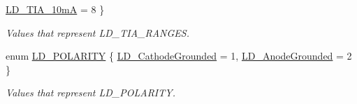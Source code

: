\begin{DoxyCompactItemize}
\hyperlink{group___t_cube_laser_diode_ggafa4a381f77aedb5578f7b24d6d170231abecf5bca7ffdbbc85793bb8972694f1b}{L\+D\+\_\+\+T\+I\+A\+\_\+10mA} = 8
 \}\begin{DoxyCompactList}\small\item\em Values that represent L\+D\+\_\+\+T\+I\+A\+\_\+\+R\+A\+N\+G\+ES. \end{DoxyCompactList}
\item 
enum \hyperlink{group___t_cube_laser_diode_ga96e125d762599dedaf1ad44586995da3}{L\+D\+\_\+\+P\+O\+L\+A\+R\+I\+TY} \{ \hyperlink{group___t_cube_laser_diode_gga96e125d762599dedaf1ad44586995da3a70a15247bc276a3c0cf4136f16e10da7}{L\+D\+\_\+\+Cathode\+Grounded} = 1, 
\hyperlink{group___t_cube_laser_diode_gga96e125d762599dedaf1ad44586995da3a7cf5d179e8b08ff3700a682aab4b6f4c}{L\+D\+\_\+\+Anode\+Grounded} = 2
 \}\begin{DoxyCompactList}\small\item\em Values that represent L\+D\+\_\+\+P\+O\+L\+A\+R\+I\+TY. \end{DoxyCompactList}
\end{DoxyCompactItemize}
